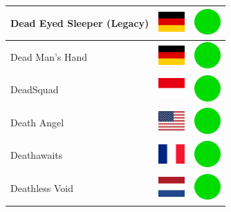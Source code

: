 \documentclass[12pt, a4paper, twoside]{report}
\begin{document}
\begin{center}
\begin{longtable}{|p{5cm}|p{2cm}|p{2cm}|}
 Dead Eyed Sleeper (Legacy)                                 & \includegraphics[width=1cm]{../img/flags/de} &   \includegraphics[width=1cm]{../likes/y} \\ \hline
 Dead Man's Hand                                            & \includegraphics[width=1cm]{../img/flags/de} &   \includegraphics[width=1cm]{../likes/y} \\ \hline
 DeadSquad                                                  & \includegraphics[width=1cm]{../img/flags/id} &   \includegraphics[width=1cm]{../likes/y} \\ \hline
 Death Angel                                                & \includegraphics[width=1cm]{../img/flags/us} &   \includegraphics[width=1cm]{../likes/y} \\ \hline
 Deathawaits                                                & \includegraphics[width=1cm]{../img/flags/fr} &   \includegraphics[width=1cm]{../likes/y} \\ \hline
 Deathless Void                                             & \includegraphics[width=1cm]{../img/flags/nl} &   \includegraphics[width=1cm]{../likes/y} \\ \hline

\end{longtable}
\end{center}
\end{document}
